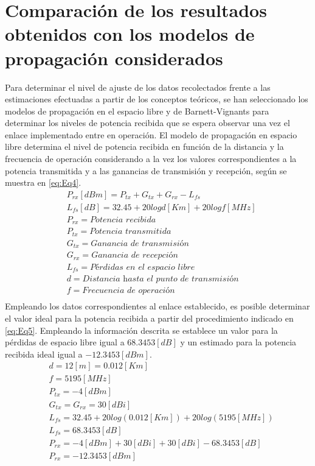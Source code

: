 \documentclass[conference]{IEEEtran}
\begin{document}
\section{Comparación de los resultados obtenidos con los modelos de propagación considerados}
Para determinar el nivel de ajuste de los datos recolectados frente a las estimaciones efectuadas a partir de 
los conceptos teóricos, se han seleccionado los modelos de propagación en el espacio libre y de Barnett-Vignants
para determinar los niveles de potencia recibida que se espera observar una vez el enlace implementado entre en operación.
El modelo de propagación en espacio libre determina el nivel de potencia recibida en función de la distancia y la 
frecuencia de operación considerando a la vez los valores correspondientes a la potencia transmitida y a las ganancias
de transmisión y recepción, según se muestra en \ref{eq:Eq4}. 
\begin{equation}
    \label{eq:Eq4}
    \begin{aligned}
        &P_{rx}[dBm] = P_{tx} + G_{tx} + G_{rx} - L_{fs}\\
        &L_{fs}[dB] = 32.45+20logd[Km]+20logf[MHz]\\
        &P_{rx} = \textit{Potencia recibida}\\
        &P_{tx} = \textit{Potencia transmitida}\\
        &G_{tx} = \textit{Ganancia de transmisión}\\
        &G_{rx} = \textit{Ganancia de recepción}\\
        &L_{fs} = \textit{Pérdidas en el espacio libre}\\
        &d = \textit{Distancia hasta el punto de transmisión}\\
        &f = \textit{Frecuencia de operación}\\
    \end{aligned}
\end{equation}
Empleando los datos correspondientes al enlace establecido, es posible determinar el valor ideal para la potencia recibida 
a partir del procedimiento indicado en \ref{eq:Eq5}. Empleando la información descrita se establece un valor para la pérdidas de espacio libre
igual a $68.3453[dB]$ y un estimado para la potencia recibida ideal igual a $-12.3453[dBm]$.
\begin{equation}
    \label{eq:Eq5}
    \begin{aligned}
        &d = 12[m] = 0.012[Km]\\
        &f = 5195[MHz]\\
        &P_{tx} = -4[dBm]\\
        &G_{tx} = G_{rx} = 30[dBi]\\
        &L_{fs} = 32.45+20log(0.012[Km])+20log(5195[MHz])\\
        &L_{fs} = 68.3453[dB]\\
        &P_{rx} = -4[dBm] + 30[dBi] + 30[dBi] - 68.3453[dB]\\
        &P_{rx} = -12.3453[dBm]
    \end{aligned}
\end{equation}
\end{document}
